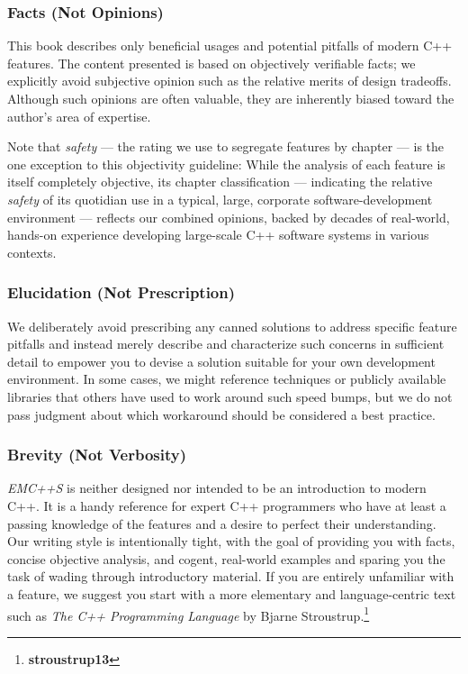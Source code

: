 \subsubsection[Facts (Not Opinions)]{Facts (Not Opinions)}

This book describes only beneficial usages and potential pitfalls of modern C++ features. The content presented is based on objectively verifiable facts; we explicitly avoid subjective opinion such as the relative merits of design tradeoffs. Although such opinions are often valuable, they are inherently biased toward the author's area of expertise. 

Note that \textit{safety} --- the rating we use to segregate features by chapter --- is the one exception to this objectivity guideline: While the analysis of each feature is itself completely objective, its chapter classification --- indicating the relative \textit{safety} of its quotidian use in a typical, large, corporate software-development environment --- reflects our combined opinions, backed by decades of real-world, hands-on experience developing large-scale C++ software systems in various contexts.

\subsubsection[Elucidation (Not Prescription)]{Elucidation (Not Prescription)}

We deliberately avoid prescribing any canned solutions to address specific feature pitfalls and instead merely describe and characterize such concerns in sufficient detail to empower you to devise a solution suitable for your own development environment. In some cases, we might reference techniques or publicly available libraries that others have used to work around such speed bumps, but we do not pass judgment about which workaround should be considered a best practice.

\subsubsection[Brevity (Not Verbosity)]{Brevity (Not Verbosity)}

\textit{EMC++S} is neither designed nor intended to be an introduction to modern C++. It is a handy reference for expert C++ programmers who have at least a passing knowledge of the features and a desire to perfect their understanding. Our writing style is intentionally tight, with the goal of providing you with facts, concise objective analysis, and cogent, real-world examples and sparing you the task of wading through introductory material. If you are entirely unfamiliar with a feature, we suggest you start with a more elementary and language-centric text such as \textit{The C++ Programming Language} by Bjarne Stroustrup.\footnote{\textbf{stroustrup13}}

